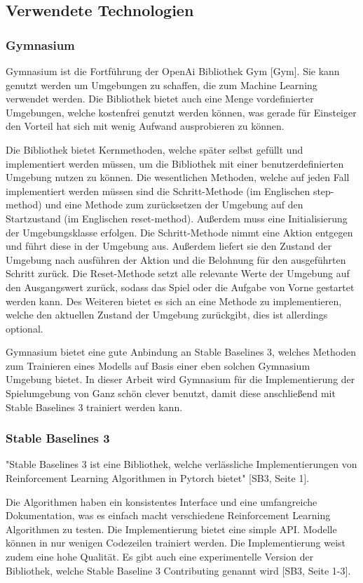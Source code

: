 \subsection{Verwendete Technologien}
\subsubsection{Gymnasium}
Gymnasium ist die Fortführung der OpenAi Bibliothek Gym [Gym]. Sie kann genutzt werden um Umgebungen zu schaffen, die zum Machine Learning verwendet werden. Die Bibliothek bietet auch eine Menge vordefinierter Umgebungen, welche kostenfrei genutzt werden können, was gerade für Einsteiger den Vorteil hat sich mit wenig Aufwand ausprobieren zu können.

Die Bibliothek bietet Kernmethoden, welche später selbst gefüllt und implementiert werden müssen, um die Bibliothek mit einer benutzerdefinierten Umgebung nutzen zu können. Die wesentlichen Methoden, welche auf jeden Fall implementiert werden müssen sind die Schritt-Methode (im Englischen step-method) und eine Methode zum zurücksetzen der Umgebung auf den Startzustand (im Englischen reset-method). Außerdem muss eine Initialisierung der Umgebungsklasse erfolgen. Die Schritt-Methode nimmt eine Aktion entgegen und führt diese in der Umgebung aus. Außerdem liefert sie den Zustand der Umgebung nach ausführen der Aktion und die Belohnung für den ausgeführten Schritt zurück. Die Reset-Methode setzt alle relevante Werte der Umgebung auf den Ausgangswert zurück, sodass das Spiel oder die Aufgabe von Vorne gestartet werden kann. Des Weiteren bietet es sich an eine Methode zu implementieren, welche den aktuellen Zustand der Umgebung zurückgibt, dies ist allerdings optional.

Gymnasium bietet eine gute Anbindung an Stable Baselines 3, welches Methoden zum Trainieren eines Modells auf Basis einer eben solchen Gymnasium Umgebung bietet. In dieser Arbeit wird Gymnasium für die Implementierung der Spielumgebung von Ganz schön clever benutzt, damit diese anschließend mit Stable Baselines 3 trainiert werden kann.
\subsubsection{Stable Baselines 3}
"Stable Baselines 3 ist eine Bibliothek, welche verlässliche Implementierungen von Reinforcement Learning Algorithmen in Pytorch bietet" [SB3, Seite 1]. 

Die Algorithmen haben ein konsistentes Interface und eine umfangreiche Dokumentation, was es einfach macht verschiedene Reinforcement Learning Algorithmen zu testen. Die Implementierung bietet eine simple API. Modelle können in nur wenigen Codezeilen trainiert werden. Die Implementierung weist zudem eine hohe Qualität. Es gibt auch eine experimentelle Version der Bibliothek, welche Stable Baseline 3 Contributing genannt wird [SB3, Seite 1-3].

